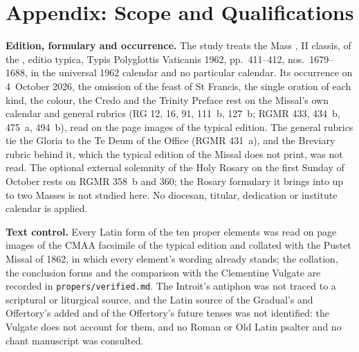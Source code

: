 \section{Appendix: Scope and Qualifications}
\label{sec:scope}

{\small
\textbf{Edition, formulary and occurrence.} The study treats the Mass
, II classis, of the
, editio typica, Typis Polyglottis Vaticanis 1962,
pp.~411--412, nos.~1679--1688, in the universal 1962 calendar and no particular
calendar. Its occurrence on 4~October 2026, the omission of the feast of St
Francis, the single oration of each kind, the colour, the Credo and the Trinity
Preface rest on the Missal's own calendar and general rubrics (RG 12, 16, 91,
111~b, 127~b; RGMR 433, 434~b, 475~a, 494~b), read on the page images of the
typical edition. The general rubrics tie the Gloria to the Te Deum of the
Office (RGMR 431~a), and the Breviary rubric behind it, which the typical
edition of the Missal does not print, was not read. The optional external solemnity of the Holy
Rosary on the first Sunday of October rests on RGMR 358~b and 360; the Rosary
formulary it brings into up to two Masses is not studied here. No diocesan,
titular, dedication or institute calendar is applied.

\textbf{Text control.} Every Latin form of the ten proper elements was read on
page images of the CMAA facsimile of the typical edition and collated with the
Pustet Missal of 1862, in which every element's wording already stands; the
collation, the conclusion forms and the comparison with the Clementine Vulgate
are recorded in \texttt{propers/verified.md}. The Introit's antiphon was not
traced to a scriptural or liturgical source, and the Latin source of the
Gradual's and Offertory's added  and of the Offertory's future
tenses was not identified: the Vulgate does not account for them, and no Roman
or Old Latin psalter and no chant manuscript was consulted.

}
